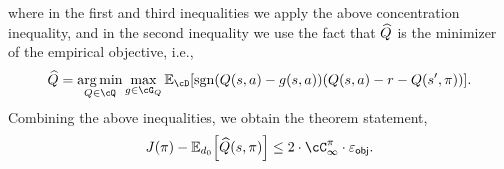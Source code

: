 where in the first and third inequalities we apply the above concentration inequality, 
and in the second inequality we use the fact that 
$\widehat{Q}$ is the minimizer of the empirical objective, i.e., 
\begin{align}
  \Qhat = \argmin_{Q \in \cQ}\max_{g \in \cG_Q}\En_{\cD}\sbr*{\sgn\rbr*{Q(s,a) - g(s,a)}\rbr*{Q(s,a) - r - Q(s',\pi)}}.
\end{align}
Combining the above inequalities, we obtain the theorem statement, 
\begin{align}
  J(\pi) - \En_{d_{0}}\sbr*{\Qhat(s,\pi)}   
  \le 
  2\cdot\Cinf \cdot \vepsobj. 
\end{align}